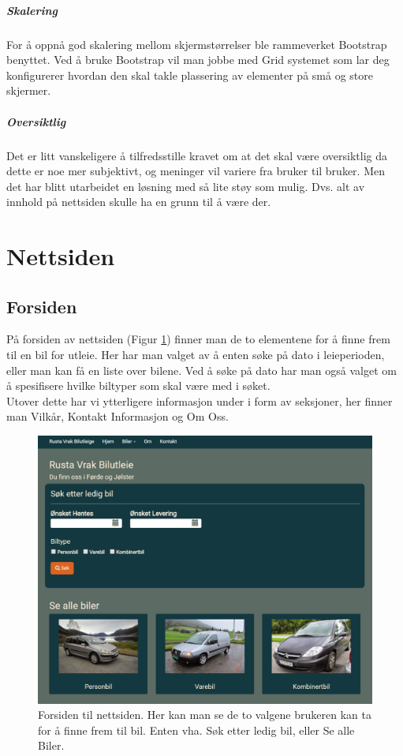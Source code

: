 \subparagraph*{Skalering}
For å oppnå god skalering mellom skjermstørrelser ble rammeverket Bootstrap benyttet. Ved å bruke Bootstrap vil man jobbe med Grid systemet som lar deg konfigurerer hvordan den skal takle plassering av elementer på små og store skjermer. 

\subparagraph*{Oversiktlig}
Det er litt vanskeligere å tilfredsstille kravet om at det skal være oversiktlig da dette er noe mer subjektivt, og meninger vil variere fra bruker til bruker. Men det har blitt utarbeidet en løsning med så lite støy som mulig. Dvs. alt av innhold på nettsiden skulle ha en grunn til å være der. 

\newpage
\section{Nettsiden}

\subsection{Forsiden}
På forsiden av nettsiden (Figur \ref{fig:rv_frontpage}) finner man de to elementene for å finne frem til en bil for utleie. Her har man valget av å enten søke på dato i leieperioden, eller man kan få en liste over bilene. Ved å søke på dato har man også valget om å spesifisere hvilke biltyper som skal være med i søket. \\

Utover dette har vi ytterligere informasjon under i form av seksjoner, her finner man Vilkår, Kontakt Informasjon og Om Oss.  

 \begin{figure}[htbp]
	\centering
		\includegraphics[scale=0.4]{Bilder/rv_frontpage.png}
	\caption[Forsiden til Nettsiden]{Forsiden til nettsiden. Her kan man se de to valgene brukeren kan ta for å finne frem til bil. Enten vha. Søk etter ledig bil, eller Se alle Biler. } %
	\label{fig:rv_frontpage}
\end{figure}


